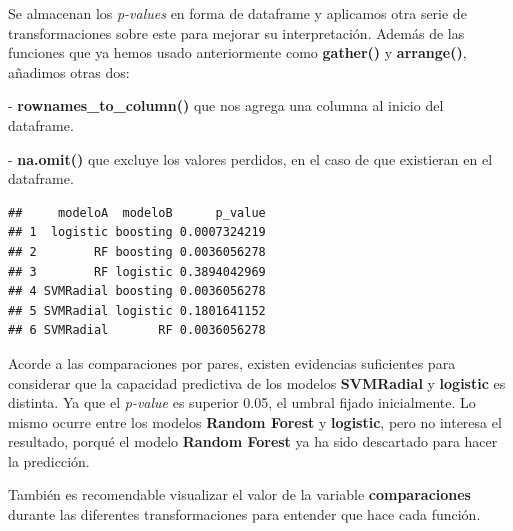 \documentclass[]{article}
\newenvironment{Shaded}{\begin{snugshade}}{\end{snugshade}}
\newcommand{\DataTypeTok}[1]{\textcolor[rgb]{0.13,0.29,0.53}{#1}}
\newcommand{\KeywordTok}[1]{\textcolor[rgb]{0.13,0.29,0.53}{\textbf{#1}}}
\newcommand{\NormalTok}[1]{#1}
\newcommand{\OperatorTok}[1]{\textcolor[rgb]{0.81,0.36,0.00}{\textbf{#1}}}
\newcommand{\StringTok}[1]{\textcolor[rgb]{0.31,0.60,0.02}{#1}}
\begin{document}
Se almacenan los \emph{p-values} en forma de dataframe y aplicamos otra serie de transformaciones sobre este para mejorar su interpretación. Además de las funciones que ya hemos usado anteriormente como \textbf{gather()} y \textbf{arrange()}, añadimos otras dos: 

- \textbf{rownames\_to\_column()} que nos agrega una columna al inicio del dataframe.

- \textbf{na.omit()} que excluye los valores perdidos, en el caso de que existieran en el dataframe.

\begin{Shaded}
\end{Shaded}

\begin{verbatim}
##     modeloA  modeloB      p_value
## 1  logistic boosting 0.0007324219
## 2        RF boosting 0.0036056278
## 3        RF logistic 0.3894042969
## 4 SVMRadial boosting 0.0036056278
## 5 SVMRadial logistic 0.1801641152
## 6 SVMRadial       RF 0.0036056278
\end{verbatim}

\vspace{3mm}

Acorde a las comparaciones por pares, existen evidencias suficientes para considerar que la capacidad predictiva de los modelos \textbf{SVMRadial} y \textbf{logistic} es distinta. Ya que el \emph{p-value} es superior 0.05, el umbral fijado inicialmente. Lo mismo ocurre entre los modelos \textbf{Random Forest} y \textbf{logistic}, pero no interesa el resultado, porqué el modelo \textbf{Random Forest} ya ha sido descartado para hacer la predicción.

También es recomendable visualizar el valor de la variable \textbf{comparaciones} durante las diferentes transformaciones para entender que hace cada función. 
\end{document}
